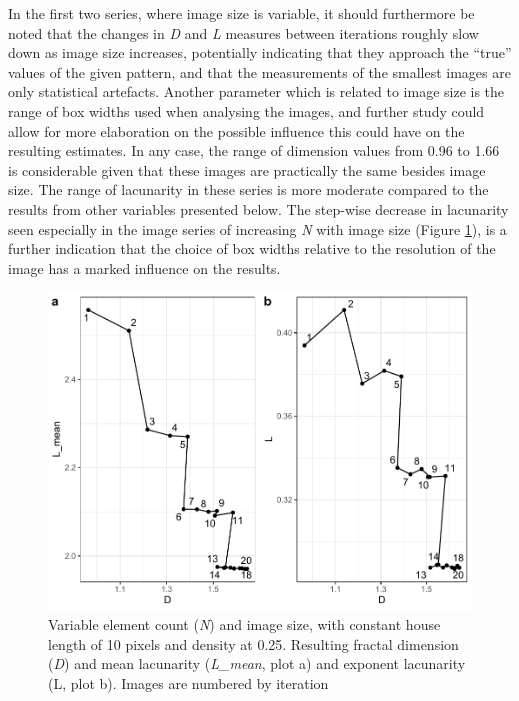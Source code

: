 \documentclass[
  12pt,
  a4paper, twoside]{book}
\begin{document}
In the first two series, where image size is variable, it should furthermore be noted that the changes in \emph{D} and \emph{L} measures between iterations roughly slow down as image size increases, potentially indicating that they approach the ``true'' values of the given pattern, and that the measurements of the smallest images are only statistical artefacts. Another parameter which is related to image size is the range of box widths used when analysing the images, and further study could allow for more elaboration on the possible influence this could have on the resulting estimates. In any case, the range of dimension values from 0.96 to 1.66 is considerable given that these images are practically the same besides image size. The range of lacunarity in these series is more moderate compared to the results from other variables presented below. The step-wise decrease in lacunarity seen especially in the image series of increasing \emph{N} with image size (Figure \ref{fig:08-N-IS}), is a further indication that the choice of box widths relative to the resolution of the image has a marked influence on the results.



\begin{figure}

{\centering \includegraphics[width=0.9\linewidth]{bookdown-demo_files/figure-latex/08-N-IS-1} 

}

\caption[D and L estimates, variable image size and element count]{Variable element count (\emph{N}) and image size, with constant house length of 10 pixels and density at 0.25. Resulting fractal dimension (\emph{D}) and mean lacunarity (\emph{L\_mean}, plot a) and exponent lacunarity (L, plot b). Images are numbered by iteration}\label{fig:08-N-IS}
\end{figure}
\end{document}
